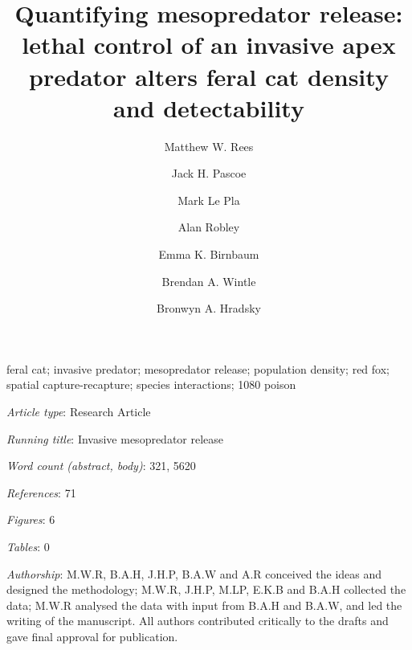 \documentclass[]{elsarticle} %
\begin{document}
\begin{frontmatter}

  \title{Quantifying mesopredator release: lethal control of an invasive apex predator alters feral cat density and detectability}
    \author[UOM]{Matthew W. Rees}
    \author[CEC]{Jack H. Pascoe}
  
    \author[CEC]{Mark Le Pla}
  
    \author[ARI]{Alan Robley}
  
    \author[CEC]{Emma K. Birnbaum}
  
    \author[UOM]{Brendan A. Wintle}
  
    \author[UOM]{Bronwyn A. Hradsky}
  
      \address[UOM]{Quantitative \& Applied Ecology Group, School of Ecosystem and Forest Science, The University of Melbourne, Parkville, VIC, Australia}
    \address[CEC]{Conservation Ecology Centre, Otway Lighthouse Rd, Cape Otway, VIC, Australia}
    \address[ARI]{Department of Environment, Land, Water and Planning, Arthur Rylah Institute for Environmental Research, Heidelberg, Australia}
  
  \begin{abstract}
  
  \end{abstract}
   \begin{keyword} feral cat; invasive predator; mesopredator release; population density; red fox; spatial capture-recapture; species interactions; 1080 poison\end{keyword}
 \end{frontmatter}

\parskip=12pt

\emph{Article type}: Research Article

\emph{Running title}: Invasive mesopredator release

\emph{Word count (abstract, body)}: 321, 5620

\emph{References}: 71

\emph{Figures}: 6

\emph{Tables}: 0

\emph{Authorship}: M.W.R, B.A.H, J.H.P, B.A.W and A.R conceived the ideas and designed the methodology; M.W.R, J.H.P, M.LP, E.K.B and B.A.H collected the data; M.W.R analysed the data with input from B.A.H and B.A.W, and led the writing of the manuscript. All authors contributed critically to the drafts and gave final approval for publication.
\end{document}
